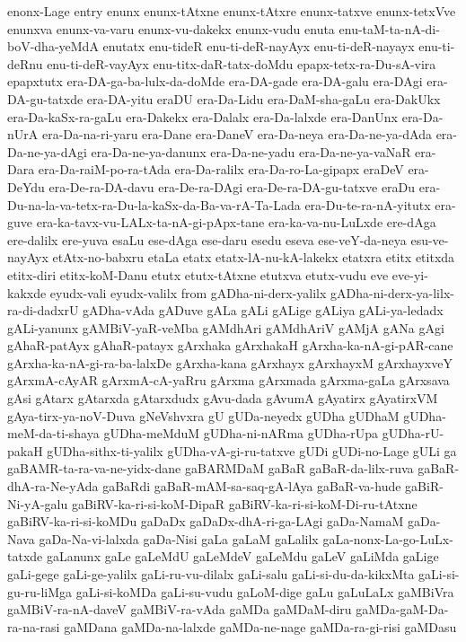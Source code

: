{enonx-Lage
entry
enunx
enunx-tAtxne
enunx-tAtxre
enunx-tatxve
enunx-tetxVve
enunxva
enunx-va-varu
enunx-vu-dakekx
enunx-vudu
enuta
enu-taM-ta-nA-di-boV-dha-yeMdA
enutatx
enu-tideR
enu-ti-deR-nayAyx
enu-ti-deR-nayayx
enu-ti-deRnu
enu-ti-deR-vayAyx
enu-titx-daR-tatx-doMdu
epapx-tetx-ra-Du-sA-vira
epapxtutx
era-DA-ga-ba-lulx-da-doMde
era-DA-gade
era-DA-galu
era-DAgi
era-DA-gu-tatxde
era-DA-yitu
eraDU
era-Da-Lidu
era-DaM-sha-gaLu
era-DakUkx
era-Da-kaSx-ra-gaLu
era-Dakekx
era-Dalalx
era-Da-lalxde
era-DanUnx
era-Da-nUrA
era-Da-na-ri-yaru
era-Dane
era-DaneV
era-Da-neya
era-Da-ne-ya-dAda
era-Da-ne-ya-dAgi
era-Da-ne-ya-danunx
era-Da-ne-yadu
era-Da-ne-ya-vaNaR
era-Dara
era-Da-raiM-po-ra-tAda
era-Da-ralilx
era-Da-ro-La-gipapx
eraDeV
era-DeYdu
era-De-ra-DA-davu
era-De-ra-DAgi
era-De-ra-DA-gu-tatxve
eraDu
era-Du-na-la-va-tetx-ra-Du-la-kaSx-da-Ba-va-rA-Ta-Lada
era-Du-te-ra-nA-yitutx
era-guve
era-ka-tavx-vu-LALx-ta-nA-gi-pApx-tane
era-ka-va-nu-LuLxde
ere-dAga
ere-dalilx
ere-yuva
esaLu
ese-dAga
ese-daru
esedu
eseva
ese-veY-da-neya
esu-ve-nayAyx
etAtx-no-babxru
etaLa
etatx
etatx-lA-nu-kA-lakekx
etatxra
etitx
etitxda
etitx-diri
etitx-koM-Danu
etutx
etutx-tAtxne
etutxva
etutx-vudu
eve
eve-yi-kakxde
eyudx-vali
eyudx-valilx
from
gADha-ni-derx-yalilx
gADha-ni-derx-ya-lilx-ra-di-dadxrU
gADha-vAda
gADuve
gALa
gALi
gALige
gALiya
gALi-ya-ledadx
gALi-yanunx
gAMBiV-yaR-veMba
gAMdhAri
gAMdhAriV
gAMjA
gANa
gAgi
gAhaR-patAyx
gAhaR-patayx
gArxhaka
gArxhakaH
gArxha-ka-nA-gi-pAR-cane
gArxha-ka-nA-gi-ra-ba-lalxDe
gArxha-kana
gArxhayx
gArxhayxM
gArxhayxveY
gArxmA-cAyAR
gArxmA-cA-yaRru
gArxma
gArxmada
gArxma-gaLa
gArxsava
gAsi
gAtarx
gAtarxda
gAtarxdudx
gAvu-dada
gAvumA
gAyatirx
gAyatirxVM
gAya-tirx-ya-noV-Duva
gNeVshvxra
gU
gUDa-neyedx
gUDha
gUDhaM
gUDha-meM-da-ti-shaya
gUDha-meMduM
gUDha-ni-nARma
gUDha-rUpa
gUDha-rU-pakaH
gUDha-sithx-ti-yalilx
gUDha-vA-gi-ru-tatxve
gUDi
gUDi-no-Lage
gULi
ga
gaBAMR-ta-ra-va-ne-yidx-dane
gaBARMDaM
gaBaR
gaBaR-da-lilx-ruva
gaBaR-dhA-ra-Ne-yAda
gaBaRdi
gaBaR-mAM-sa-saq-gA-lAya
gaBaR-va-hude
gaBiR-Ni-yA-galu
gaBiRV-ka-ri-si-koM-DipaR
gaBiRV-ka-ri-si-koM-Di-ru-tAtxne
gaBiRV-ka-ri-si-koMDu
gaDaDx
gaDaDx-dhA-ri-ga-LAgi
gaDa-NamaM
gaDa-Nava
gaDa-Na-vi-lalxda
gaDa-Nisi
gaLa
gaLaM
gaLalilx
gaLa-nonx-La-go-LuLx-tatxde
gaLanunx
gaLe
gaLeMdU
gaLeMdeV
gaLeMdu
gaLeV
gaLiMda
gaLige
gaLi-gege
gaLi-ge-yalilx
gaLi-ru-vu-dilalx
gaLi-salu
gaLi-si-du-da-kikxMta
gaLi-si-gu-ru-liMga
gaLi-si-koMDa
gaLi-su-vudu
gaLoM-dige
gaLu
gaLuLaLx
gaMBiVra
gaMBiV-ra-nA-daveV
gaMBiV-ra-vAda
gaMDa
gaMDaM-diru
gaMDa-gaM-Da-ra-na-rasi
gaMDana
gaMDa-na-lalxde
gaMDa-ne-nage
gaMDa-ra-gi-risi
gaMDasu
}
